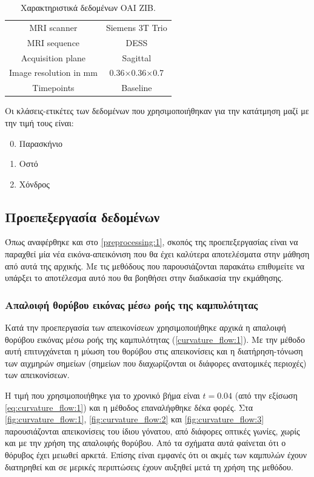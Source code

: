 \documentclass[a4paper,12pt]{article}
\begin{document}
\begin{table}[h!]
    \centering
    \begin{tabular}{|c|c|} 
        \hline
        MRI scanner            & Siemens 3T Trio \\ 
        MRI sequence           & DESS            \\
        Acquisition plane      & Sagittal        \\
        Image resolution in mm & 0.36×0.36×0.7   \\
        Timepoints             & Baseline        \\
        \hline
    \end{tabular}
    \caption{Χαρακτηριστικά δεδομένων OAI ZIB.}
    \label{dataset:1}
\end{table}

Οι κλάσεις-ετικέτες των δεδομένων που χρησιμοποιήθηκαν για την κατάτμηση μαζί με
την τιμή τους είναι:

\begin{enumerate}
    \setcounter{enumi}{-1} 
    \item Παρασκήνιο
    \item Οστό
    \item Χόνδρος
\end{enumerate}

\subsection{Προεπεξεργασία δεδομένων}

Όπως αναφέρθηκε και στο \ref{preprocessing:1}, σκοπός της προεπεξεργασίας είναι
να παραχθεί μία νέα εικόνα-απεικόνιση που θα έχει καλύτερα αποτελέσματα στην
μάθηση από αυτά της αρχικής. Με τις μεθόδους που παρουσιάζονται παρακάτω
επιθυμείτε να υπάρξει το αποτέλεσμα αυτό που θα βοηθήσει στην διαδικασία την
εκμάθησης.

\subsubsection{Απαλοιφή θορύβου εικόνας μέσω ροής της καμπυλότητας}

Κατά την προεπεργασία των απεικονίσεων χρησιμοποιήθηκε αρχικά η απαλοιφή θορύβου
εικόνας μέσω ροής της καμπυλότητας (\ref{curvature_flow:1}). Με την μέθοδο αυτή
επιτυγχάνεται η μύωση του θορύβου στις απεικονίσεις και η διατήρηση-τόνωση των
αιχμηρών σημείων (σημείων που διαχωρίζονται οι διάφορες ανατομικές περιοχές) των
απεικονίσεων.

Η τιμή που χρησιμοποιήθηκε για το χρονικό βήμα είναι $t=0.04$ (από την εξίσωση
\eqref{eq:curvature_flow:1}) και η μέθοδος επαναλήφθηκε δέκα φορές.  Στα
\autoref{fig:curvature_flow:1}, \autoref{fig:curvature_flow:2} και
\autoref{fig:curvature_flow:3} παρουσιάζονται απεικονίσεις του ίδιου γόνατου,
από διάφορες οπτικές γωνίες, χωρίς και με την χρήση της απαλοιφής θορύβου. Από
τα σχήματα αυτά φαίνεται ότι ο θόρυβος έχει μειωθεί αρκετά. Επίσης είναι εμφανές
ότι οι ακμές των καμπυλών έχουν διατηρηθεί και σε μερικές περιπτώσεις έχουν
αυξηθεί μετά τη χρήση της μεθόδου.
\end{document}
